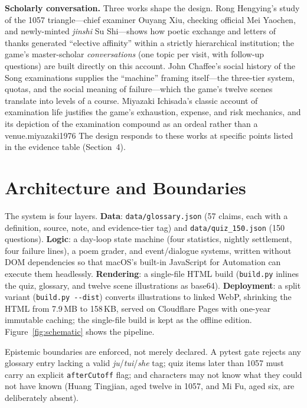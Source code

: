 \documentclass[12pt,a4paper]{article}
\begin{document}
\textbf{Scholarly conversation.} Three works shape the design. Rong
Hengying's study of the 1057 triangle---chief examiner Ouyang Xiu, checking
official Mei Yaochen, and newly-minted \emph{jinshi} Su Shi---shows how
poetic exchange and letters of thanks generated ``elective affinity'' within
a strictly hierarchical institution; the game's master-scholar
\emph{conversations} (one topic per visit, with follow-up questions) are
built directly on this account.\autocite[175--193]{rong2019} John Chaffee's
social history of the Song examinations supplies the ``machine'' framing
itself---the three-tier system, quotas, and the social meaning of
failure---which the game's twelve scenes translate into levels of a
course.\autocite{chaffee1985} Miyazaki Ichisada's classic account of
examination life justifies the game's exhaustion, expense, and risk
mechanics, and its depiction of the examination compound as an ordeal rather
than a venue.\autocite{24--38}{miyazaki1976} The design responds to these
works at specific points listed in the evidence table (Section~4).

\section{Architecture and Boundaries}

The system is four layers. \textbf{Data}: \texttt{data/glossary.json}
(57 claims, each with a definition, source, note, and evidence-tier tag) and
\texttt{data/quiz\_150.json} (150 questions). \textbf{Logic}: a day-loop
state machine (four statistics, nightly settlement, four failure lines), a
poem grader, and event/dialogue systems, written without DOM dependencies so
that macOS's built-in JavaScript for Automation can execute them headlessly.
\textbf{Rendering}: a single-file HTML build (\texttt{build.py} inlines the
quiz, glossary, and twelve scene illustrations as base64). \textbf{Deployment}:
a split variant (\texttt{build.py -{}-dist}) converts illustrations to linked
WebP, shrinking the HTML from 7.9\,MB to 158\,KB, served on Cloudflare Pages
with one-year immutable caching; the single-file build is kept as the offline
edition. Figure~\ref{fig:schematic} shows the pipeline.

Epistemic boundaries are enforced, not merely declared. A pytest gate rejects
any glossary entry lacking a valid \emph{ju}/\emph{tui}/\emph{she} tag; quiz
items later than 1057 must carry an explicit \texttt{afterCutoff} flag; and
characters may not know what they could not have known (Huang Tingjian, aged
twelve in 1057, and Mi Fu, aged six, are deliberately absent).
\end{document}
